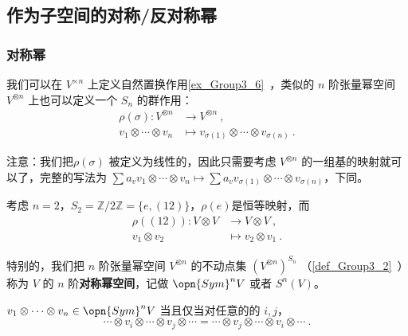 


\subsection{作为子空间的对称/反对称幂}

\subsubsection{对称幂}

我们可以在 $V^{\times n}$ 上定义自然置换作用\autoref{ex_Group3_6}~，类似的 $n$ 阶张量幂空间 $V^{\otimes n}$ 上也可以定义一个 $S_n$ 的群作用：
\begin{equation}
\begin{aligned}
\rho(\sigma): V^{\otimes n} &\to V^{\otimes n}~, \\
v_1 \otimes \cdots \otimes v_n &\mapsto v_{\sigma(1)} \otimes \cdots \otimes v_{\sigma(n)}~.
\end{aligned}
\end{equation}


注意：我们把$\rho(\sigma)$ 被定义为线性的，因此只需要考虑 $V^{\otimes n}$ 的一组基的映射就可以了，完整的写法为 $\sum a_v v_1 \otimes \cdots \otimes v_n \mapsto \sum a_v v_{\sigma(1)} \otimes \cdots \otimes v_{\sigma(n)}$，下同。

\begin{example}{}
考虑 $n = 2$，$S_2 = \mathbb{Z}/2\mathbb{Z} = \{e, (1 2)\}$，$\rho(e)$是恒等映射，而
\begin{equation}
\begin{aligned}
\rho((1 2)): V \otimes V &\to V \otimes V~, \\
v_1 \otimes v_2 &\mapsto v_2 \otimes v_1~.
\end{aligned}
\end{equation}
\end{example}

特别的，我们把 $n$ 阶张量幂空间 $V^{\otimes n}$ 的不动点集 $(V^{\otimes n})^{S_n}$ （\autoref{def_Group3_2}~）称为 $V$ 的 $n$ 阶\textbf{对称幂空间}，记做 $\opn{Sym}^n V$ 或者 $S^n(V)$。

\begin{exercise}{}
$v_1 \otimes \cdots \otimes v_n \in \opn{Sym}^n V$ 当且仅当对任意的的 $i, j$，
\begin{equation}
\cdots \otimes v_i \otimes \cdots \otimes v_j \otimes \cdots = \cdots \otimes v_j \otimes \cdots \otimes v_i \otimes \cdots~.
\end{equation}

\end{exercise}

